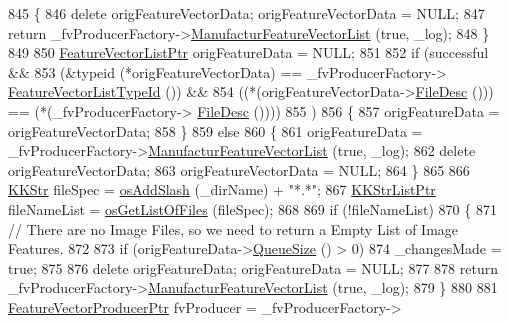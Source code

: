 \begin{DoxyCode}
845   \{
846     \textcolor{keyword}{delete}  origFeatureVectorData;  origFeatureVectorData = NULL;
847     \textcolor{keywordflow}{return}  \_fvProducerFactory->\hyperlink{class_k_k_m_l_l_1_1_factory_f_v_producer_a96126b7adb55f6751450ede393c93086}{ManufacturFeatureVectorList} (\textcolor{keyword}{true}, \_log);
848   \}
849 
850   \hyperlink{class_k_k_m_l_l_1_1_feature_vector_list}{FeatureVectorListPtr}  origFeatureData = NULL;
851 
852   \textcolor{keywordflow}{if}  (successful  &&
853        (&\textcolor{keyword}{typeid} (*origFeatureVectorData) == \_fvProducerFactory->
      \hyperlink{class_k_k_m_l_l_1_1_factory_f_v_producer_a066a7019c56163b37b15ace4ba7cb39a}{FeatureVectorListTypeId} ())  &&
854        ((*(origFeatureVectorData->\hyperlink{class_k_k_m_l_l_1_1_feature_vector_list_a736923be9c4ac7553a5aa87dd24efd16}{FileDesc} ())) ==  (*(\_fvProducerFactory->
      \hyperlink{class_k_k_m_l_l_1_1_factory_f_v_producer_ab2dea2e51cf9d6a109b52300619e185c}{FileDesc} ())))
855       )
856   \{
857      origFeatureData = origFeatureVectorData;
858   \}
859   \textcolor{keywordflow}{else}
860   \{
861     origFeatureData = \_fvProducerFactory->\hyperlink{class_k_k_m_l_l_1_1_factory_f_v_producer_a96126b7adb55f6751450ede393c93086}{ManufacturFeatureVectorList} (\textcolor{keyword}{true}, 
      \_log);
862     \textcolor{keyword}{delete}  origFeatureVectorData;
863     origFeatureVectorData = NULL;
864   \}
865 
866   \hyperlink{class_k_k_b_1_1_k_k_str}{KKStr}  fileSpec = \hyperlink{namespace_k_k_b_aa0d40119b911df4283399a1724cab1ef}{osAddSlash} (\_dirName) + \textcolor{stringliteral}{"*.*"};
867   \hyperlink{class_k_k_b_1_1_k_k_str_list}{KKStrListPtr}   fileNameList = \hyperlink{namespace_k_k_b_a47f37fe64afeebf0baffdf389148c3ba}{osGetListOfFiles} (fileSpec);
868 
869   \textcolor{keywordflow}{if}  (!fileNameList)
870   \{
871     \textcolor{comment}{// There are no Image Files,  so we need to return a Empty List of Image Features.}
872 
873     \textcolor{keywordflow}{if}  (origFeatureData->\hyperlink{class_k_k_b_1_1_k_k_queue_a1dab601f75ee6a65d97f02bddf71c40d}{QueueSize} () > 0)
874       \_changesMade = \textcolor{keyword}{true};
875 
876     \textcolor{keyword}{delete}  origFeatureData;  origFeatureData = NULL;
877 
878     \textcolor{keywordflow}{return}  \_fvProducerFactory->\hyperlink{class_k_k_m_l_l_1_1_factory_f_v_producer_a96126b7adb55f6751450ede393c93086}{ManufacturFeatureVectorList} (\textcolor{keyword}{true}, \_log);
879   \}
880 
881   \hyperlink{class_k_k_m_l_l_1_1_feature_vector_producer}{FeatureVectorProducerPtr}  fvProducer = \_fvProducerFactory->

\end{DoxyCode}
